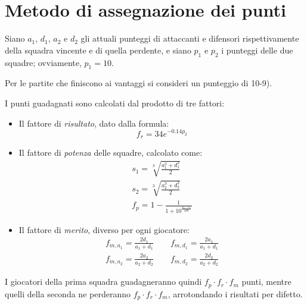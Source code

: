 \documentclass[11pt,a4 paper]{article}
\begin{document}
	
	\section*{Metodo di assegnazione dei punti}
	
		
	Siano $a_1$, $d_1$, $a_2$ e $d_2$ gli attuali punteggi di attaccanti e difensori rispettivamente della squadra vincente e di quella perdente, e siano $p_1$ e $p_2$ i punteggi delle due squadre; ovviamente, $p_1=10$.
	
	Per le partite che finiscono ai vantaggi si consideri un punteggio di 10-9). 
	
	I punti guadagnati sono calcolati dal prodotto di tre fattori:
	
	\begin{itemize}
		\item Il fattore di \emph{risultato}, dato dalla formula:
		\[
		f_r = 34e^{-0.14p_2}
		\]
		\item Il fattore di \emph{potenza} delle squadre, calcolato come:
		\begin{gather*}
		s_1 = \sqrt[3]{\frac{a_1^3+d_1^3}{2}} \\
		s_2 = \sqrt[3]{\frac{a_2^3+d_2^3}{2}} \\
		f_p = 1 - \frac{1}{1+10^{\frac{s_2-s_1}{400}}}
		\end{gather*}
		\item Il fattore di \emph{merito}, diverso per ogni giocatore:
		\begin{gather*}
		f_{m,a_1} = \frac{2d_1}{a_1+d_1} \qquad
		f_{m,d_1} = \frac{2a_1}{a_1+d_1} \\
		f_{m,a_2} = \frac{2a_2}{a_2+d_2} \qquad
		f_{m,d_2} = \frac{2d_2}{a_2+d_2}
		\end{gather*}
		
	\end{itemize}

	I giocatori della prima squadra guadagneranno quindi $f_p\cdot f_r\cdot f_m$ punti, mentre quelli della seconda ne perderanno $f_p\cdot f_r\cdot f_m$, arrotondando i risultati per difetto.
	
	
	
\end{document}
